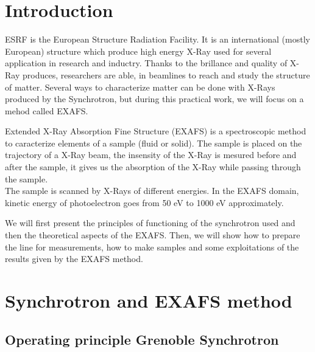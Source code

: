 \documentclass[11pt,a4paper,oneside]{report}
\begin{document}

\pagestyle{fancy}

\chapter*{Introduction}
ESRF is the European Structure Radiation Facility. It is an international (mostly European) structure which produce high energy X-Ray used for several application in research and inductry. Thanks to the brillance and quality of X-Ray produces, researchers are able, in beamlines to reach and study the structure of matter. Several ways to characterize matter can be done with X-Rays produced by the Synchrotron, but during this practical work, we will focus on a mehod called EXAFS.

Extended X-Ray Absorption Fine Structure (EXAFS) is a spectroscopic method to caracterize elements of a sample (fluid or solid). The sample is placed on the trajectory of a X-Ray beam, the insensity of the X-Ray is mesured before and after the sample, it gives us the absorption of the X-Ray while passing through the sample.\\
The sample is scanned by X-Rays of different energies. In the EXAFS domain, kinetic energy of photoelectron goes from 50 eV to 1000 eV approximately.

We will first present the principles of functioning of the synchrotron used and then the theoretical aspects of the EXAFS. Then, we will show how to prepare the line for measurements, how to make samples and some exploitations of the results given by the EXAFS method.


\chapter{Synchrotron and EXAFS method}

\section{Operating principle Grenoble Synchrotron}
\end{document}
